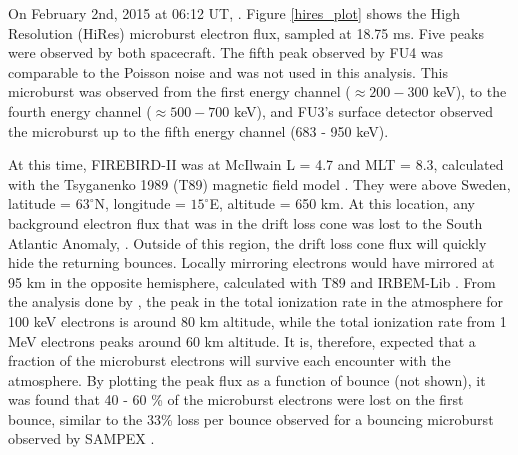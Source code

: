 \documentclass[draft, linenumbers]{agujournal}
\begin{document}
On February 2nd, 2015 at 06:12 UT, . Figure \ref{hires_plot} shows the High Resolution (HiRes) microburst electron flux, sampled at 18.75 ms. Five peaks were observed by both spacecraft. The fifth peak observed by FU4 was comparable to the Poisson noise and was not used in this analysis. This microburst was observed from the first energy channel ($\approx 200-300$ keV), to the fourth energy channel ($\approx 500-700$ keV), and FU3's surface detector observed the microburst up to the fifth energy channel (683 - 950 keV). 


 At this time, FIREBIRD-II was at McIlwain L = 4.7 and MLT = 8.3, calculated with the Tsyganenko 1989 (T89) magnetic field model \citep{Tsyganenko1989}. They were above Sweden, latitude = $63^{\circ}$N, longitude = $15^{\circ}$E, altitude = 650 km. At this location, any background electron flux that was in the drift loss cone was lost to the South Atlantic Anomaly, . Outside of this region, the drift loss cone flux will quickly hide the returning bounces. Locally mirroring electrons would have mirrored at 95 km in the opposite hemisphere, calculated with T89 and IRBEM-Lib \citep{irbem}. From the analysis done by \citet{Fang2010}, the peak in the total ionization rate in the atmosphere for 100 keV electrons is around 80 km altitude, while the total ionization rate from 1 MeV electrons peaks around 60 km altitude. It is, therefore, expected that a fraction of the microburst electrons will survive each encounter with the atmosphere. By plotting the peak flux as a function of bounce (not shown), it was found that 40 - 60 \% of the microburst electrons were lost on the first bounce, similar to the 33\% loss per bounce observed for a bouncing microburst observed by SAMPEX \citep{Thorne2005}.
\end{document}
